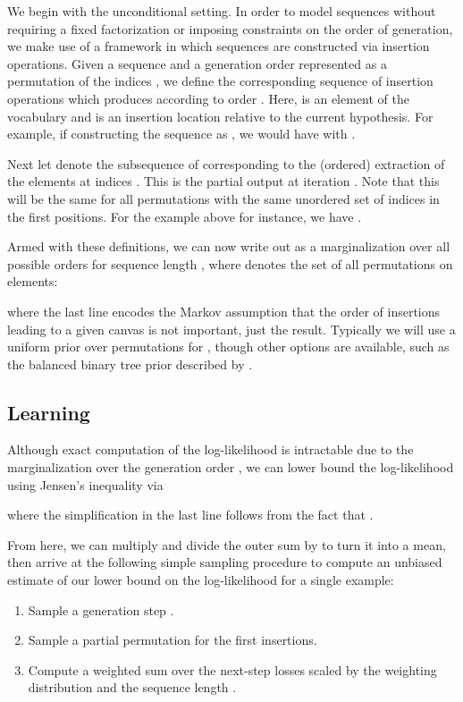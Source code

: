 \documentclass{article}
\begin{document}
We begin with the unconditional setting. In order to model sequences without requiring a fixed factorization or imposing constraints on the order of generation, we make use of a framework in which sequences are constructed via insertion operations. Given a sequence  and a generation order  represented as a permutation of the indices , we define the corresponding sequence  of insertion operations which produces  according to order . Here,  is an element of the vocabulary and  is an insertion location relative to the current hypothesis. For example, if constructing the sequence  as , we would have  with .


Next let  denote the subsequence of  corresponding to the (ordered) extraction of the elements at indices . This is the partial output at iteration . Note that this will be the same for all permutations  with the same unordered set of indices in the first  positions. For the example above for instance, we have .


Armed with these definitions, we can now write out  as a marginalization over all possible orders  for sequence length , where  denotes the set of all permutations on  elements:
\begingroup
\allowdisplaybreaks

\endgroup
where the last line encodes the Markov assumption that the order of insertions leading to a given canvas is not important, just the result. Typically we will use a uniform prior over permutations for , though other options are available, such as the balanced binary tree prior described by \citet{stern-icml-2019}.

\subsection{Learning}

Although exact computation of the log-likelihood is intractable due to the marginalization over the generation order , we can lower bound the log-likelihood using Jensen's inequality via





where the simplification in the last line follows from the fact that .

From here, we can multiply and divide the outer sum by  to turn it into a mean, then arrive at the following simple sampling procedure to compute an unbiased estimate of our lower bound  on the log-likelihood for a single example:
\begin{enumerate}
\item Sample a generation step .
\item Sample a partial permutation  for the first  insertions.
\item Compute a weighted sum over the next-step losses  scaled by the weighting distribution  and the sequence length .
\end{enumerate}
\end{document}
